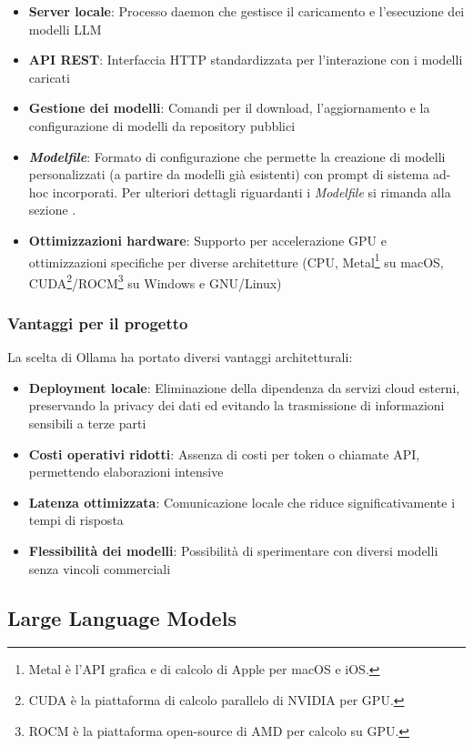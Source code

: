 \documentclass[12pt]{report}
\begin{document}
\begin{itemize}
    \item \textbf{Server locale}: Processo daemon che gestisce il caricamento e l'esecuzione dei modelli LLM
    \item \textbf{API REST}: Interfaccia HTTP standardizzata per l'interazione con i modelli caricati
    \item \textbf{Gestione dei modelli}: Comandi per il download, l'aggiornamento e la configurazione di modelli da repository pubblici
    \item \textit{\textbf{Modelfile}}: Formato di configurazione che permette la creazione di modelli personalizzati (a partire da modelli già esistenti) con prompt di sistema ad-hoc incorporati. Per ulteriori dettagli riguardanti i \textit{Modelfile} si rimanda alla sezione .
    \item \textbf{Ottimizzazioni hardware}: Supporto per accelerazione GPU e ottimizzazioni specifiche per diverse architetture (CPU, Metal\footnote{Metal è l'API grafica e di calcolo di Apple per macOS e iOS.} su macOS, CUDA\footnote{CUDA è la piattaforma di calcolo parallelo di NVIDIA per GPU.}/ROCM\footnote{ROCM è la piattaforma open-source di AMD per calcolo su GPU.} su Windows e GNU/Linux)
\end{itemize}

\subsubsection{Vantaggi per il progetto}
La scelta di Ollama ha portato diversi vantaggi architetturali:

\begin{itemize}
    \item \textbf{Deployment locale}: Eliminazione della dipendenza da servizi cloud esterni, preservando la privacy dei dati ed evitando la trasmissione di informazioni sensibili a terze parti
    \item \textbf{Costi operativi ridotti}: Assenza di costi per token o chiamate API, permettendo elaborazioni intensive
    \item \textbf{Latenza ottimizzata}: Comunicazione locale che riduce significativamente i tempi di risposta
    \item \textbf{Flessibilità dei modelli}: Possibilità di sperimentare con diversi modelli senza vincoli commerciali
\end{itemize}

\subsection{Large Language Models}
\label{subsec:llm}
\end{document}

